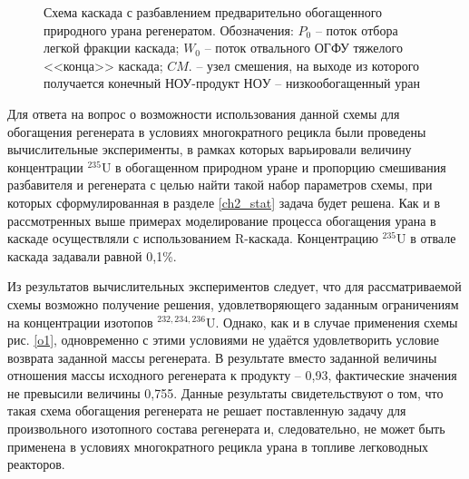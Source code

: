\begin{figure}[ht]
  \caption{Схема каскада с разбавлением предварительно обогащенного природного урана регенератом. Обозначения: $P_0$ -- поток отбора легкой фракции каскада; $W_0$ -- поток отвального ОГФУ тяжелого <<конца>> каскада; $CM.$ -- узел смешения, на выходе из которого получается конечный НОУ-продукт $НОУ$  -- низкообогащенный уран}\label{o2}
\end{figure}

Для ответа на вопрос о возможности использования данной схемы для обогащения регенерата в условиях многократного рецикла были проведены вычислительные эксперименты, в рамках которых варьировали величину концентрации $^{235}$U в обогащенном природном уране и пропорцию смешивания разбавителя и регенерата с целью найти такой набор параметров схемы, при которых сформулированная в разделе \ref{ch2_stat} задача будет решена. Как и в рассмотренных выше примерах моделирование процесса обогащения урана в каскаде осуществляли с использованием R-каскада. Концентрацию $^{235}$U в отвале каскада задавали равной 0,1\%.

Из результатов вычислительных экспериментов следует, что для рассматриваемой схемы возможно получение решения, удовлетворяющего заданным ограничениям на концентрации изотопов $^{232,234,236}$U. Однако, как и в случае применения схемы рис. \ref{o1}, одновременно с этими условиями не удаётся удовлетворить условие возврата заданной массы регенерата. В результате вместо заданной величины отношения массы исходного регенерата к продукту -- 0,93, фактические значения не превысили величины 0,755. Данные результаты свидетельствуют о том, что такая схема обогащения регенерата не решает поставленную задачу для произвольного изотопного состава регенерата и, следовательно, не может быть применена в условиях многократного рецикла урана в топливе легководных реакторов.

